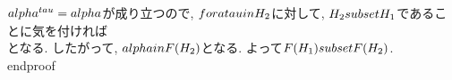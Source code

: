 { $\\alpha^{\\tau}=\\alpha$が成り立つので, $\\fora \\tau\\in H_{2}$に対して,
 $H_{2}\\subset H_{1}$であることに気を付ければ
 \\[
  \\alpha^{\\tau}=\\alpha
 \\]
 となる. したがって, $\\alpha\\in \\F(H_{2})$となる. よって$\\F(H_{1})\\subset \\F(H_{2})$.
\\end{proof}

}
